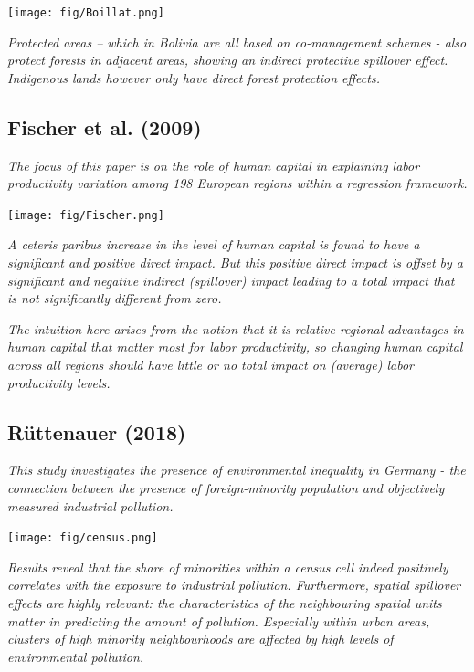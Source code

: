 \documentclass[
  letterpaper,
]{scrbook}
\begin{document}
\texttt{[image: fig/Boillat.png]}

\emph{Protected areas -- which in Bolivia are all based on co-management
schemes - also protect forests in adjacent areas, showing an indirect
protective spillover effect. Indigenous lands however only have direct
forest protection effects.}

\hypertarget{fischer.2009}{%
\subsection*{Fischer et al. (2009)}\label{fischer.2009}}

\emph{The focus of this paper is on the role of human capital in
explaining labor productivity variation among 198 European regions
within a regression framework.}

\texttt{[image: fig/Fischer.png]}

\emph{A ceteris paribus increase in the level of human capital is found
to have a significant and positive direct impact. But this positive
direct impact is offset by a significant and negative indirect
(spillover) impact leading to a total impact that is not significantly
different from zero.}

\emph{The intuition here arises from the notion that it is relative
regional advantages in human capital that matter most for labor
productivity, so changing human capital across all regions should have
little or no total impact on (average) labor productivity levels.}

\hypertarget{ruttenauer.2018a}{%
\subsection*{Rüttenauer (2018)}\label{ruttenauer.2018a}}

\emph{This study investigates the presence of environmental inequality
in Germany - the connection between the presence of foreign-minority
population and objectively measured industrial pollution.}

\texttt{[image: fig/census.png]}

\emph{Results reveal that the share of minorities within a census cell
indeed positively correlates with the exposure to industrial pollution.
Furthermore, spatial spillover effects are highly relevant: the
characteristics of the neighbouring spatial units matter in predicting
the amount of pollution. Especially within urban areas, clusters of high
minority neighbourhoods are affected by high levels of environmental
pollution.}
\end{document}
